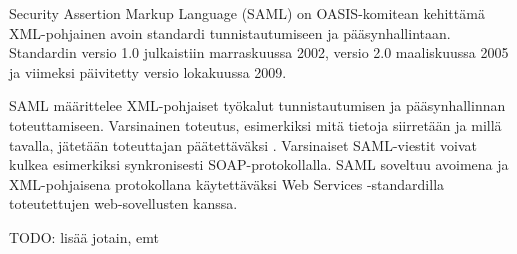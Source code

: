 Security Assertion Markup Language (SAML) on OASIS-komitean kehittämä XML-pohjainen avoin standardi tunnistautumiseen ja pääsynhallintaan. Standardin versio 1.0 julkaistiin marraskuussa 2002, versio 2.0 maaliskuussa 2005 ja viimeksi päivitetty versio lokakuussa 2009.

SAML määrittelee XML-pohjaiset työkalut tunnistautumisen ja pääsynhallinnan toteuttamiseen. Varsinainen toteutus, esimerkiksi mitä tietoja siirretään ja millä tavalla, jätetään toteuttajan päätettäväksi \cite{dynamic_saml}. Varsinaiset SAML-viestit voivat kulkea esimerkiksi synkronisesti SOAP-protokollalla. SAML soveltuu avoimena ja XML-pohjaisena protokollana käytettäväksi Web Services -standardilla toteutettujen web-sovellusten kanssa.

TODO: lisää jotain, emt